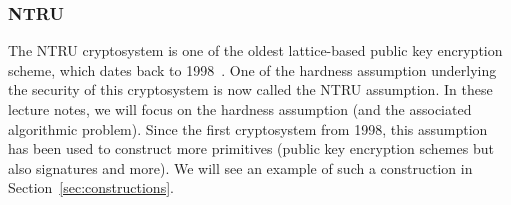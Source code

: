 



\subsubsection{NTRU}
The NTRU cryptosystem is one of the oldest lattice-based public key encryption scheme, which dates back to 1998~\cite{NTRU}. One of the hardness assumption underlying the security of this cryptosystem is now called the NTRU assumption. In these lecture notes, we will focus on the hardness assumption (and the associated algorithmic problem). Since the first cryptosystem from 1998, this assumption has been used to construct more primitives (public key encryption schemes but also signatures and more). We will see an example of such a construction in Section~\ref{sec:constructions}.

